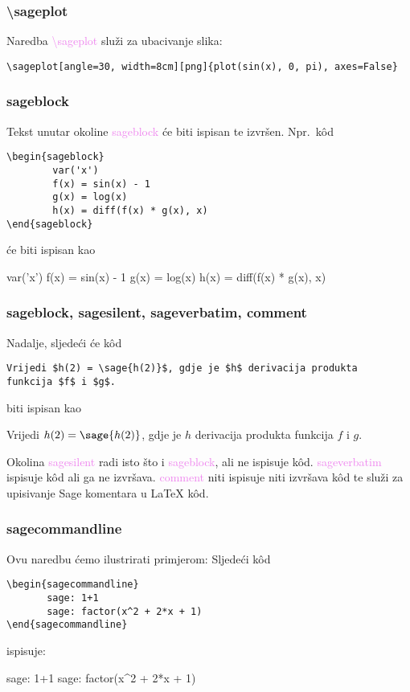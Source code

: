 \documentclass{beamer}
\begin{document}
\begin{frame}[fragile]\frametitle{\textbackslash sageplot}
Naredba \textcolor{violet}{\textbackslash sageplot} služi za ubacivanje slika:
\begin{lstlisting}
\sageplot[angle=30, width=8cm][png]{plot(sin(x), 0, pi), axes=False}  
\end{lstlisting}
\begin{center}
\end{center}
\end{frame}

\begin{frame}[fragile]\frametitle{sageblock}
Tekst unutar okoline \textcolor{violet}{sageblock} će biti ispisan te izvršen. Npr.\ k\^od
\begin{lstlisting}
\begin{sageblock}
        var('x')
        f(x) = sin(x) - 1
        g(x) = log(x)
        h(x) = diff(f(x) * g(x), x)
\end{sageblock}  
\end{lstlisting}
će biti ispisan kao
\begin{sageblock}
        var('x')
        f(x) = sin(x) - 1
        g(x) = log(x)
        h(x) = diff(f(x) * g(x), x)
\end{sageblock}
\end{frame}

\begin{frame}[fragile]\frametitle{sageblock, sagesilent, sageverbatim, comment}
Nadalje, sljedeći će k\^od    
\begin{lstlisting}
Vrijedi $h(2) = \sage{h(2)}$, gdje je $h$ derivacija produkta 
funkcija $f$ i $g$.  
\end{lstlisting}
biti ispisan kao
\begin{block}{}
Vrijedi $h(2) = \sage{h(2)}$, gdje je $h$ derivacija produkta funkcija $f$ i $g$.  
\end{block}
Okolina \textcolor{violet}{sagesilent} radi isto što i \textcolor{violet}{sageblock}, ali ne ispisuje k\^od. \textcolor{violet}{sageverbatim} ispisuje k\^od ali ga ne izvršava. \textcolor{violet}{comment} niti ispisuje niti izvršava k\^od te služi za upisivanje Sage komentara u \LaTeX{} k\^od.
\end{frame}

\begin{frame}[fragile]\frametitle{sagecommandline}
Ovu naredbu ćemo ilustrirati primjerom:
Sljedeći k\^od 
\begin{lstlisting}
\begin{sagecommandline}
       sage: 1+1
       sage: factor(x^2 + 2*x + 1)
\end{sagecommandline}        
\end{lstlisting}    
ispisuje:
\begin{sagecommandline}
       sage: 1+1
       sage: factor(x^2 + 2*x + 1)
\end{sagecommandline} 
\end{frame}
\end{document}
